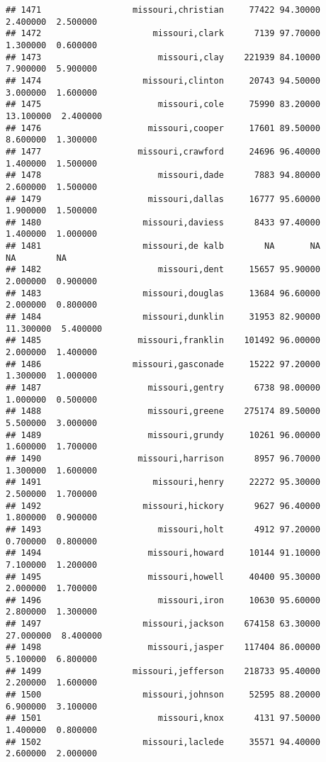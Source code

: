 \documentclass[
]{article}
\begin{document}
\begin{verbatim}
## 1471                  missouri,christian     77422 94.30000  2.400000  2.500000
## 1472                      missouri,clark      7139 97.70000  1.300000  0.600000
## 1473                       missouri,clay    221939 84.10000  7.900000  5.900000
## 1474                    missouri,clinton     20743 94.50000  3.000000  1.600000
## 1475                       missouri,cole     75990 83.20000 13.100000  2.400000
## 1476                     missouri,cooper     17601 89.50000  8.600000  1.300000
## 1477                   missouri,crawford     24696 96.40000  1.400000  1.500000
## 1478                       missouri,dade      7883 94.80000  2.600000  1.500000
## 1479                     missouri,dallas     16777 95.60000  1.900000  1.500000
## 1480                    missouri,daviess      8433 97.40000  1.400000  1.000000
## 1481                    missouri,de kalb        NA       NA        NA        NA
## 1482                       missouri,dent     15657 95.90000  2.000000  0.900000
## 1483                    missouri,douglas     13684 96.60000  2.000000  0.800000
## 1484                    missouri,dunklin     31953 82.90000 11.300000  5.400000
## 1485                   missouri,franklin    101492 96.00000  2.000000  1.400000
## 1486                  missouri,gasconade     15222 97.20000  1.300000  1.000000
## 1487                     missouri,gentry      6738 98.00000  1.000000  0.500000
## 1488                     missouri,greene    275174 89.50000  5.500000  3.000000
## 1489                     missouri,grundy     10261 96.00000  1.600000  1.700000
## 1490                   missouri,harrison      8957 96.70000  1.300000  1.600000
## 1491                      missouri,henry     22272 95.30000  2.500000  1.700000
## 1492                    missouri,hickory      9627 96.40000  1.800000  0.900000
## 1493                       missouri,holt      4912 97.20000  0.700000  0.800000
## 1494                     missouri,howard     10144 91.10000  7.100000  1.200000
## 1495                     missouri,howell     40400 95.30000  2.000000  1.700000
## 1496                       missouri,iron     10630 95.60000  2.800000  1.300000
## 1497                    missouri,jackson    674158 63.30000 27.000000  8.400000
## 1498                     missouri,jasper    117404 86.00000  5.100000  6.800000
## 1499                  missouri,jefferson    218733 95.40000  2.200000  1.600000
## 1500                    missouri,johnson     52595 88.20000  6.900000  3.100000
## 1501                       missouri,knox      4131 97.50000  1.400000  0.800000
## 1502                    missouri,laclede     35571 94.40000  2.600000  2.000000

\end{verbatim}
\end{document}
